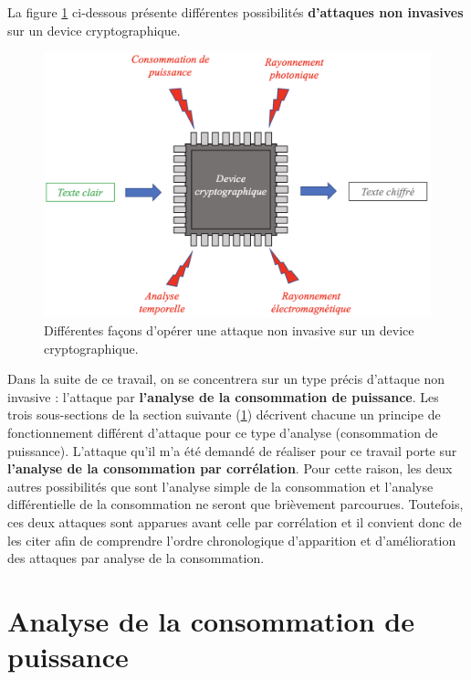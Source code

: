 \documentclass[oneside]{book}
\begin{document}
\newpage

\hspace{-0.5 cm}La figure \ref{fig:attackpassive} ci-dessous présente différentes possibilités \textbf{d'attaques non invasives} sur un device cryptographique.
\begin{figure}[htbp]
    \centering
    \includegraphics[scale=0.7]{image/attackpassive}
    \caption{Différentes façons d'opérer une attaque non invasive sur un device cryptographique.}
    \label{fig:attackpassive}
\end{figure}

Dans la suite de ce travail, on se concentrera sur un type précis d'attaque non invasive : l'attaque par \textbf{l'analyse de la consommation de puissance}. Les trois sous-sections de la section suivante (\ref{sec:PowerGeneral}) décrivent chacune un principe de fonctionnement différent d'attaque pour ce type d'analyse (consommation de puissance). L'attaque qu'il m'a été demandé de réaliser pour ce travail porte sur \textbf{l'analyse de la consommation par corrélation}. Pour cette raison, les deux autres possibilités que sont l'analyse simple de la consommation et l'analyse différentielle de la consommation ne seront que brièvement parcourues. Toutefois, ces deux attaques sont apparues avant celle par corrélation et il convient donc de les citer afin de comprendre l'ordre chronologique d'apparition et d'amélioration des attaques par analyse de la consommation.

\newpage

\section{Analyse de la consommation de puissance}
\label{sec:PowerGeneral}
\end{document}
